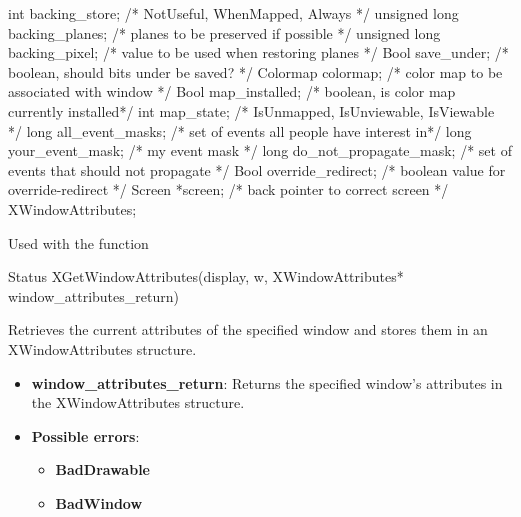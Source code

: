 \documentclass{report}
\begin{document}
\begin{itemize}
\begin{cppcode}
{                    int backing_store;                  /* NotUseful, WhenMapped, Always */
                    unsigned long backing_planes;       /* planes to be preserved if possible */
                    unsigned long backing_pixel;        /* value to be used when restoring planes */
                    Bool save_under;                    /* boolean, should bits under be saved? */
                    Colormap colormap;                  /* color map to be associated with window */
                    Bool map_installed;                 /* boolean, is color map currently installed*/
                    int map_state;                      /* IsUnmapped, IsUnviewable, IsViewable */
                    long all_event_masks;               /* set of events all people have interest in*/
                    long your_event_mask;               /* my event mask */
                    long do_not_propagate_mask;         /* set of events that should not propagate */
                    Bool override_redirect;             /* boolean value for override-redirect */
                    Screen *screen;                     /* back pointer to correct screen */
                } XWindowAttributes;
                \end{cppcode}
                \bigbreak \noindent 
                Used with the function
                \bigbreak \noindent 
                \begin{cppcode}
                    Status XGetWindowAttributes(display, w, XWindowAttributes* window_attributes_return)
                \end{cppcode}
                \bigbreak \noindent
                Retrieves the current attributes of the specified window and stores them in an XWindowAttributes structure.
                \begin{itemize}
                    \item \textbf{window\_attributes\_return}: Returns the specified window’s attributes in the XWindowAttributes structure.
                \end{itemize}
                \begin{itemize}
                    \item \textbf{Possible errors}:
                        \begin{itemize}
                            \item \textbf{BadDrawable}
                            \item \textbf{BadWindow}
                        \end{itemize}

\end{itemize}
\end{itemize}
\end{document}
